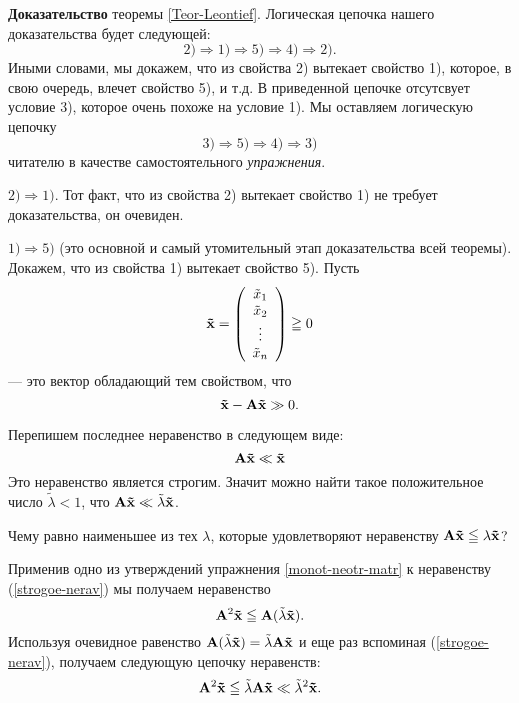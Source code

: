     \textbf{Доказательство} теоремы \ref{Teor-Leontief}. Логическая
    цепочка нашего доказательства будет следующей:
    \[2)\Rightarrow 1)\Rightarrow 5)\Rightarrow 4)\Rightarrow 2).\]
    Иными словами, мы докажем, что из свойства 2) вытекает свойство
    1), которое, в свою очередь, влечет свойство 5), и т.д. В приведенной
    цепочке отсутсвует условие 3), которое очень похоже на условие 1). Мы
    оставляем логическую цепочку
    \[3)\Rightarrow 5)\Rightarrow 4)\Rightarrow 3)\]
    читателю в качестве самостоятельного \emph{упражнения}.

    $2)\Rightarrow 1)$. Тот факт, что из
    свойства 2) вытекает свойство 1) не требует доказательства, он
    очевиден.

    $1)\Rightarrow 5)$ (это основной и самый утомительный этап доказательства всей теоремы).
    Докажем, что из свойства 1) вытекает свойство 5).
        Пусть \[\mathbf{\tilde{x}}=\left(
     \begin{array}{c}
        \tilde{x}_{1} \\
        \tilde{x}_{2} \\
        \vdots \\
        \tilde{x}_{n}\\
      \end{array}\right)\geqq0\] --- это вектор обладающий тем свойством, что
        \[\mathbf{\tilde{x}}-\mathbf{A}\mathbf{\tilde{x}}\gg0.\]



        Перепишем   последнее неравенство в следующем виде:
\begin{equation} \label{strogoe-nerav}
        \mathbf{A}\mathbf{\tilde{x}}\ll\mathbf{\tilde{x}}
\end{equation}
        Это неравенство является строгим. Значит
        можно найти такое положительное число $\tilde{\lambda}<1$,
        что $\mathbf{A}\mathbf{\tilde{x}}\ll\tilde{\lambda}\mathbf{\tilde{x}}$.

\begin{exer}
    Чему равно наименьшее из тех $\lambda$, которые удовлетворяют неравенству
    $\mathbf{A}\mathbf{\tilde{x}}\leqq\lambda\mathbf{\tilde{x}}$?
\end{exer}

    Применив одно из утверждений упражнения \ref{monot-neotr-matr} к
    неравенству (\ref{strogoe-nerav})
    мы получаем неравенство
    \[\mathbf{A}^{2}\mathbf{\tilde{x}}\leqq \mathbf{A}(\tilde{\lambda}\mathbf{\tilde{x}}).\]
    Используя очевидное равенство
    $\mathbf{A}(\tilde{\lambda}\mathbf{\tilde{x}})=\tilde{\lambda}\mathbf{A}\mathbf{\tilde{x}}$
    и еще раз вспоминая (\ref{strogoe-nerav}), получаем следующую
    цепочку неравенств:
    \[\mathbf{A}^{2}\mathbf{\tilde{x}}\leqq\tilde{\lambda}\mathbf{A}\mathbf{\tilde{x}}
    \ll\tilde{\lambda}^{2}\mathbf{\tilde{x}}.\]


